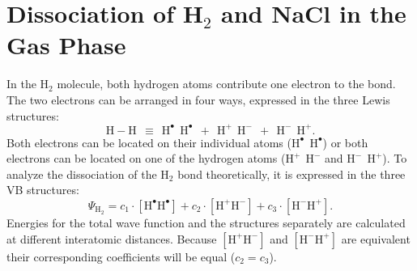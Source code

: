 \section{Dissociation of H$_2$ and NaCl in the Gas Phase}

In the H$_2$ molecule, both hydrogen atoms contribute one electron to the bond. The two electrons can be arranged in four ways, expressed in the three Lewis structures:
\begin{equation}
\nonumber
\mathrm{H-H\ \ \equiv \ \ H^{\bullet}\ \ H^{\bullet}\ \ +\ \ H^{+}\ \ H^{-}\ \ +\ \ H^{-}\ \ H^{+}}.
\end{equation}
Both electrons can be located on their individual atoms ($\mathrm{H^{\bullet}\ \ H^{\bullet}}$) or both electrons can be located on one of the hydrogen atoms ($\mathrm{H^{+}\ \ H^{-}}$ and $\mathrm{H^{-}\ \ H^{+}}$). To analyze the dissociation of the H$_2$ bond theoretically, it is expressed in the three VB structures:
\begin{equation}
\nonumber
\Psi_{\mathrm{H_2}} = c_1\cdot [\mathrm{H}^\bullet \mathrm{H}^\bullet] + c_2 \cdot [\mathrm{H}^{+}\mathrm{H}^{-}] + c_3 \cdot [\mathrm{H}^{-}\mathrm{H}^{+}]. 
\end{equation}
Energies for the total wave function and the structures separately are calculated at different interatomic distances. Because $[\mathrm{H}^{+}\mathrm{H}^{-}]$ and $[\mathrm{H}^{-}\mathrm{H}^{+}]$ are equivalent their corresponding coefficients will be equal ($c_2 = c_3$).  

